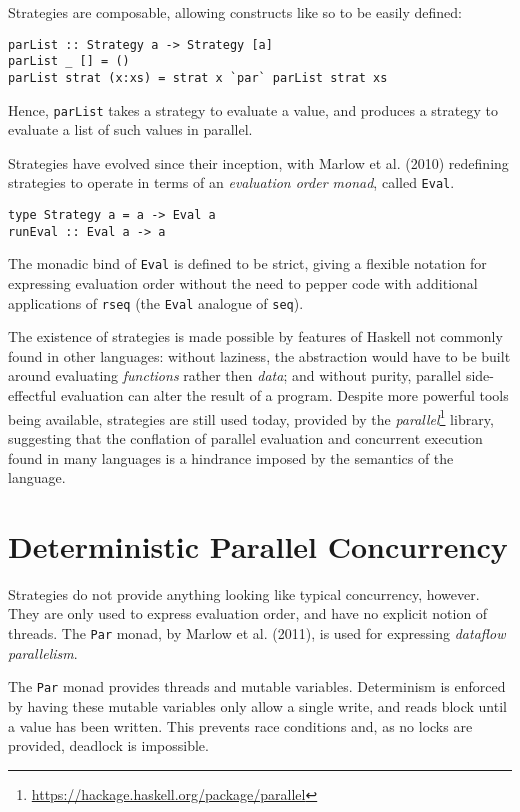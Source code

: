 Strategies are composable, allowing constructs like so to be easily
defined:

\begin{verbatim}
parList :: Strategy a -> Strategy [a]
parList _ [] = ()
parList strat (x:xs) = strat x `par` parList strat xs
\end{verbatim}

Hence, \verb|parList| takes a strategy to evaluate a value, and
produces a strategy to evaluate a list of such values in
parallel.

Strategies have evolved since their inception, with Marlow et
al. (2010)\nocite{strategies} redefining strategies to operate in
terms of an \textit{evaluation order monad}, called \verb|Eval|.

\begin{verbatim}
type Strategy a = a -> Eval a
runEval :: Eval a -> a
\end{verbatim}

The monadic bind of \verb|Eval| is defined to be strict, giving a
flexible notation for expressing evaluation order without the need to
pepper code with additional applications of \verb|rseq| (the
\verb|Eval| analogue of \verb|seq|).

The existence of strategies is made possible by features of Haskell
not commonly found in other languages: without laziness, the
abstraction would have to be built around evaluating
\textit{functions} rather then \textit{data}; and without purity,
parallel side-effectful evaluation can alter the result of a
program. Despite more powerful tools being available, strategies are
still used today, provided by the
\textit{parallel}\footnote{\url{https://hackage.haskell.org/package/parallel}}
library, suggesting that the conflation of parallel evaluation and
concurrent execution found in many languages is a hindrance imposed by
the semantics of the language.

\section{Deterministic Parallel Concurrency}
\label{sec:litrev-det}

Strategies do not provide anything looking like typical concurrency,
however. They are only used to express evaluation order, and have no
explicit notion of threads. The \verb|Par| monad, by Marlow et
al. (2011)\nocite{parmonad}, is used for expressing \textit{dataflow
  parallelism}.

The \verb|Par| monad provides threads and mutable
variables. Determinism is enforced by having these mutable variables
only allow a single write, and reads block until a value has been
written. This prevents race conditions and, as no locks are provided,
deadlock is impossible.

